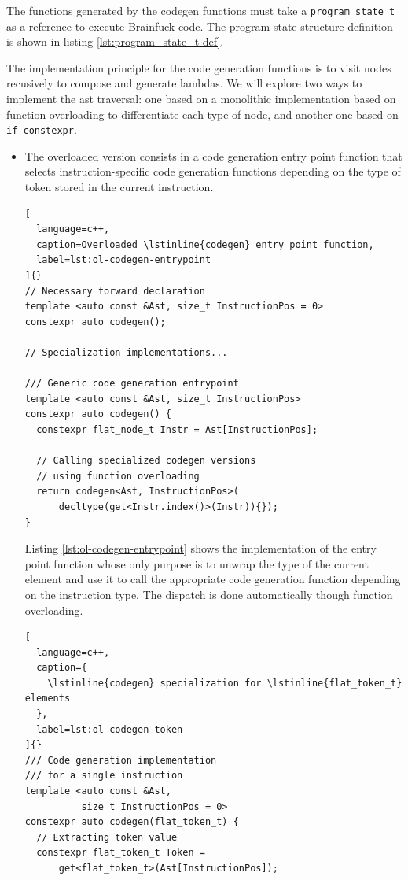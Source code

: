 \documentclass[../main]{subfiles}
\begin{document}
The functions generated by the codegen functions must take a
\lstinline{program_state_t} as a reference to execute Brainfuck code.
The program state structure definition is shown in listing
\ref{lst:program_state_t-def}.

The implementation principle for the code generation functions is to visit
nodes recusively to compose and generate lambdas.
We will explore two ways to implement the \gls{ast} traversal:
one based on a monolithic implementation based on function overloading
to differentiate each type of node, and another one based on
\lstinline{if constexpr}.

\begin{itemize}
\item
The overloaded version consists in a code generation entry point function
that selects instruction-specific code generation functions depending
on the type of token stored in the current instruction.

\begin{lstlisting}[
  language=c++,
  caption=Overloaded \lstinline{codegen} entry point function,
  label=lst:ol-codegen-entrypoint
]{}
// Necessary forward declaration
template <auto const &Ast, size_t InstructionPos = 0>
constexpr auto codegen();

// Specialization implementations...

/// Generic code generation entrypoint
template <auto const &Ast, size_t InstructionPos>
constexpr auto codegen() {
  constexpr flat_node_t Instr = Ast[InstructionPos];

  // Calling specialized codegen versions
  // using function overloading
  return codegen<Ast, InstructionPos>(
      decltype(get<Instr.index()>(Instr)){});
}
\end{lstlisting}

Listing \ref{lst:ol-codegen-entrypoint} shows the implementation
of the entry point function whose only purpose is to unwrap the type
of the current element and use it to call the appropriate code generation
function depending on the instruction type.
The dispatch is done automatically though function overloading.

\begin{lstlisting}[
  language=c++,
  caption={
    \lstinline{codegen} specialization for \lstinline{flat_token_t} elements
  },
  label=lst:ol-codegen-token
]{}
/// Code generation implementation
/// for a single instruction
template <auto const &Ast,
          size_t InstructionPos = 0>
constexpr auto codegen(flat_token_t) {
  // Extracting token value
  constexpr flat_token_t Token =
      get<flat_token_t>(Ast[InstructionPos]);


\end{lstlisting}
\end{itemize}
\end{document}
